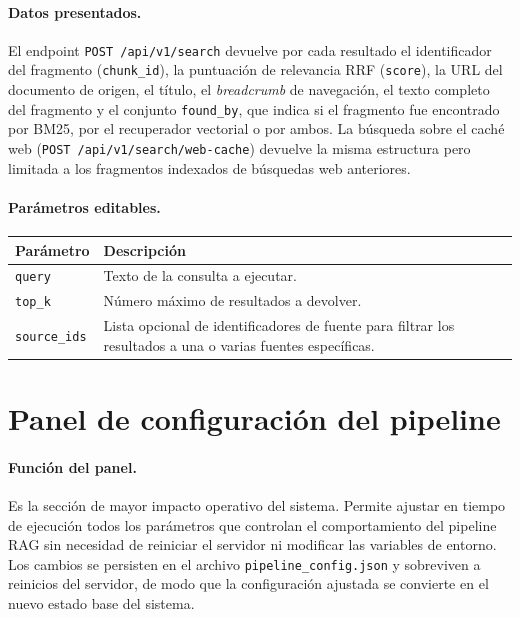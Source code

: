\documentclass[11pt]{article}
\begin{document}
\paragraph{Datos presentados.}
El endpoint \texttt{POST /api/v1/search} devuelve por cada resultado el identificador del
fragmento (\texttt{chunk\_id}), la puntuación de relevancia RRF (\texttt{score}), la URL
del documento de origen, el título, el \emph{breadcrumb} de navegación, el texto completo
del fragmento y el conjunto \texttt{found\_by}, que indica si el fragmento fue encontrado
por BM25, por el recuperador vectorial o por ambos. La búsqueda sobre el caché web
(\texttt{POST /api/v1/search/web-cache}) devuelve la misma estructura pero limitada a los
fragmentos indexados de búsquedas web anteriores.

\paragraph{Parámetros editables.}

\begin{center}
\begin{tabular}{lp{9cm}}
\toprule
\textbf{Parámetro} & \textbf{Descripción} \\
\midrule
\texttt{query}      & Texto de la consulta a ejecutar. \\
\texttt{top\_k}     & Número máximo de resultados a devolver. \\
\texttt{source\_ids} & Lista opcional de identificadores de fuente para filtrar los
                       resultados a una o varias fuentes específicas. \\
\bottomrule
\end{tabular}
\end{center}

\section{Panel de configuración del pipeline}

\paragraph{Función del panel.}
Es la sección de mayor impacto operativo del sistema. Permite ajustar en tiempo de ejecución
todos los parámetros que controlan el comportamiento del pipeline RAG sin necesidad de
reiniciar el servidor ni modificar las variables de entorno. Los cambios se persisten en el
archivo \texttt{pipeline\_config.json} y sobreviven a reinicios del servidor, de modo que la
configuración ajustada se convierte en el nuevo estado base del sistema.
\end{document}
